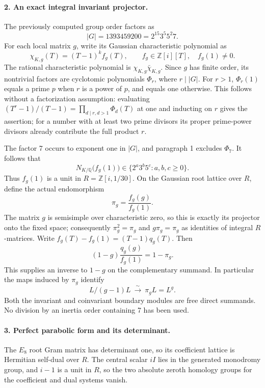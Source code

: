 \paragraph{2. An exact integral invariant projector.}
The previously computed group order factors as
\[
 |G|=1393459200=2^{15}3^5 5^2 7.
\]
For each local matrix \(g\), write its Gaussian characteristic
polynomial as
\[
 \chi_{K,g}(T)=(T-1)^k f_g(T),\qquad
 f_g\in\mathbb Z[i][T],\quad f_g(1)\ne0.
\]
The rational characteristic polynomial is
\(\chi_{K,g}\bar\chi_{K,g}\). Since \(g\) has finite order,
its nontrivial factors are cyclotomic polynomials \(\Phi_r\),
where \(r\mid |G|\). For \(r>1\),
\(\Phi_r(1)\) equals a prime \(p\) when \(r\) is a power of
\(p\), and equals one otherwise. This follows without a
factorization assumption: evaluating
\((T^r-1)/(T-1)=\prod_{d\mid r,d>1}\Phi_d(T)\) at one and
inducting on \(r\) gives the assertion; for a number with at
least two prime divisors its proper prime-power divisors already
contribute the full product \(r\).

The factor 7 occurs to exponent one in \(|G|\), and paragraph 1
excludes \(\Phi_7\). It follows that
\[
 N_{K/\mathbb Q}\bigl(f_g(1)\bigr)
                         \in\{2^a3^b5^c:a,b,c\ge0\}.
\]
Thus \(f_g(1)\) is a unit in \(R=\mathbb Z[i,1/30]\).
On the Gaussian root lattice over \(R\), define the actual
endomorphism
\[
                 \pi_g=\frac{f_g(g)}{f_g(1)}.
\]
The matrix \(g\) is semisimple over characteristic zero, so this
is exactly its projector onto the fixed space; consequently
\(\pi_g^2=\pi_g\) and \(g\pi_g=\pi_g\) as identities of
integral \(R\)-matrices. Write
\(f_g(T)-f_g(1)=(T-1)q_g(T)\). Then
\[
 (1-g)\frac{q_g(g)}{f_g(1)}=1-\pi_g.
\]
This supplies an inverse to \(1-g\) on the complementary summand.
In particular the maps induced by \(\pi_g\) identify
\[
 L/(g-1)L\ \xrightarrow{\ \sim\ }\ \pi_gL=L^g.
\]
Both the invariant and coinvariant boundary modules are free direct
summands. No division by an inertia order containing 7 has been used.

\paragraph{3. Perfect parabolic form and its determinant.}
The \(E_8\) root Gram matrix has determinant one, so its
coefficient lattice is Hermitian self-dual over \(R\). The central
scalar \(iI\) lies in the generated monodromy group, and
\(i-1\) is a unit in \(R\), so the two absolute zeroth
homology groups for the coefficient and dual systems vanish.

